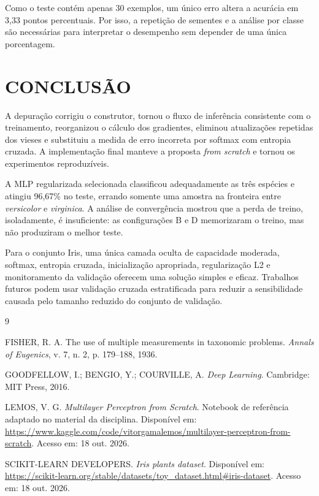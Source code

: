\documentclass[12pt,a4paper,oneside,openany,chapter=TITLE,section=TITLE,subsection=TITLE,brazil]{abntex2}
\newcommand{\pct}[1]{#1\%}
\begin{document}
Como o teste contém apenas 30 exemplos, um único erro altera a acurácia em 3,33 pontos percentuais. Por isso, a repetição de sementes e a análise por classe são necessárias para interpretar o desempenho sem depender de uma única porcentagem.

\chapter{CONCLUSÃO}

A depuração corrigiu o construtor, tornou o fluxo de inferência consistente com o treinamento, reorganizou o cálculo dos gradientes, eliminou atualizações repetidas dos vieses e substituiu a medida de erro incorreta por softmax com entropia cruzada. A implementação final manteve a proposta \textit{from scratch} e tornou os experimentos reproduzíveis.

A MLP regularizada selecionada classificou adequadamente as três espécies e atingiu \pct{96,67} no teste, errando somente uma amostra na fronteira entre \textit{versicolor} e \textit{virginica}. A análise de convergência mostrou que a perda de treino, isoladamente, é insuficiente: as configurações B e D memorizaram o treino, mas não produziram o melhor teste.

Para o conjunto Iris, uma única camada oculta de capacidade moderada, softmax, entropia cruzada, inicialização apropriada, regularização L2 e monitoramento da validação oferecem uma solução simples e eficaz. Trabalhos futuros podem usar validação cruzada estratificada para reduzir a sensibilidade causada pelo tamanho reduzido do conjunto de validação.

\postextual

\begin{thebibliography}{9}

FISHER, R. A. The use of multiple measurements in taxonomic problems. \textit{Annals of Eugenics}, v. 7, n. 2, p. 179--188, 1936.

GOODFELLOW, I.; BENGIO, Y.; COURVILLE, A. \textit{Deep Learning}. Cambridge: MIT Press, 2016.

LEMOS, V. G. \textit{Multilayer Perceptron from Scratch}. Notebook de referência adaptado no material da disciplina. Disponível em: \url{https://www.kaggle.com/code/vitorgamalemos/multilayer-perceptron-from-scratch}. Acesso em: 18 out. 2026.

SCIKIT-LEARN DEVELOPERS. \textit{Iris plants dataset}. Disponível em: \url{https://scikit-learn.org/stable/datasets/toy_dataset.html#iris-dataset}. Acesso em: 18 out. 2026.

\end{thebibliography}
\end{document}
